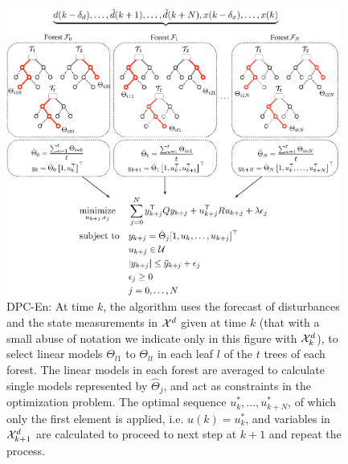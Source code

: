 \begin{figure}[t!]
	\centering
	\includegraphics[width=26pc]{figures/dpc-algo-rf.eps}
	\caption{\textcolor[rgb]{0,0,1}{DPC-En: At time $k$, the algorithm uses the forecast of disturbances and the state measurements in $\mathcal{X}^d$ given at time $k$ (that with a small abuse of notation we indicate only in this figure with $\mathcal{X}^d_k$), to select linear models $\Theta_{l1}$ to $\Theta_{lt}$ in each leaf $l$ of the $t$ trees of each forest. The linear models in each forest are averaged to calculate single models represented by $\hat{\Theta}_j$, and act as constraints in the optimization problem. The optimal sequence $u^*_k,\ldots,u^*_{k+N}$, of which only the first element is applied, i.e. $u(k)=u^*_k$, and variables in $\mathcal{X}^d_{k+1}$ are calculated to proceed to next step at $k+1$ and repeat the process.}}
	\label{F:dpc-algo-rf}
\end{figure}